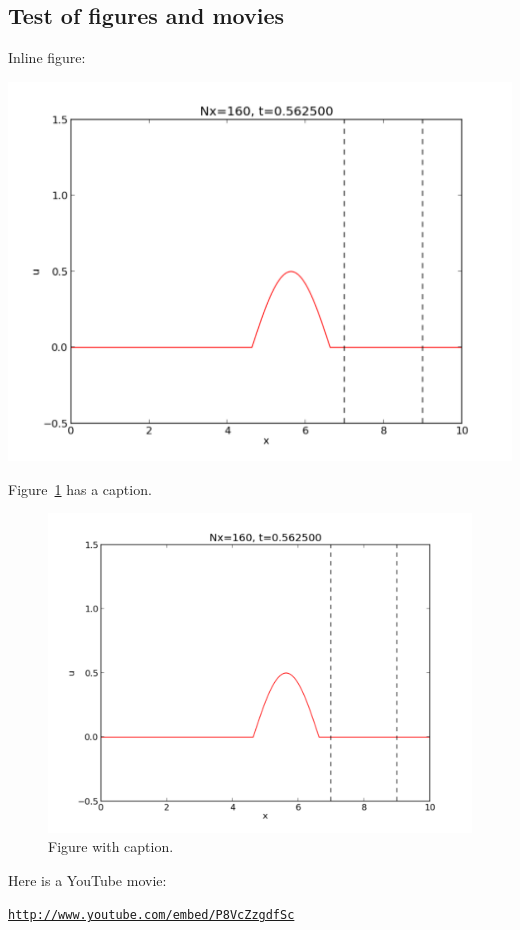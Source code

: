 \documentclass[%
twoside,                 %
final,                   %
10pt]{article}
\newenvironment{doconce:movie}{}{}
\newcounter{doconce:movie:counter}
\begin{document}
\noindent
\subsection{Test of figures and movies}

Inline figure:



\centerline{\includegraphics[width=0.7\linewidth]{../doc/src/manual/fig/wave1D.pdf}}



Figure~\ref{fig1} has a caption.


\begin{figure}[t]
  \centerline{\includegraphics[width=0.7\linewidth]{../doc/src/manual/fig/wave1D.pdf}}
  \caption{
  Figure with caption. \label{fig1}
  }
\end{figure}


Here is a YouTube movie:


\begin{doconce:movie}
\begin{center}
\href{{http://www.youtube.com/embed/P8VcZzgdfSc}}{\nolinkurl{http://www.youtube.com/embed/P8VcZzgdfSc}}
\end{center}
\end{doconce:movie}
\end{document}
